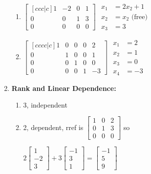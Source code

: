 \begin{multicols}{2}
\begin{enumerate}
\begin{enumerate}
	\item 
$
\begin{bmatrix}[ccc|c]
 1 & -2 & 0 & 1 \\
 0 & 0 & 1 & 3 \\
 0 & 0 & 0 & 0
\end{bmatrix}
$
$
\begin{array}{rl}
x_1&=2x_2+1  \\
x_2&=x_2 \text{ (free)} \\
x_3&=3
\end{array}
$


	\item 
$
\begin{bmatrix}[cccc|c]
 1 & 0 & 0 & 0 & 2 \\
 0 & 1 & 0 & 0 & 1 \\
 0 & 0 & 1 & 0 & 0 \\
 0 & 0 & 0 & 1 & -3
\end{bmatrix}
$
$
\begin{array}{rl}
x_1&=2  \\
x_2&=1 \\
x_3&=0\\
x_4&=-3
\end{array}
$

\end{enumerate}







\item \textbf{Rank and Linear Dependence:}
\begin{enumerate}
	\item 3, independent
	\item 2, dependent, 
	rref is $\begin{bmatrix}
 1 & 0 & 2 \\
 0 & 1 & 3 \\
 0 & 0 & 0
	\end{bmatrix}
	$ 
	so
	
$
2\begin{bmatrix}
 1  \\
 -2  \\
 3 
\end{bmatrix}
+3\begin{bmatrix}
 -1 \\
 3  \\
 1 
\end{bmatrix}
=\begin{bmatrix}
-1 \\
 5 \\
 9
\end{bmatrix}
$


\end{enumerate}
\end{enumerate}
\end{multicols}
